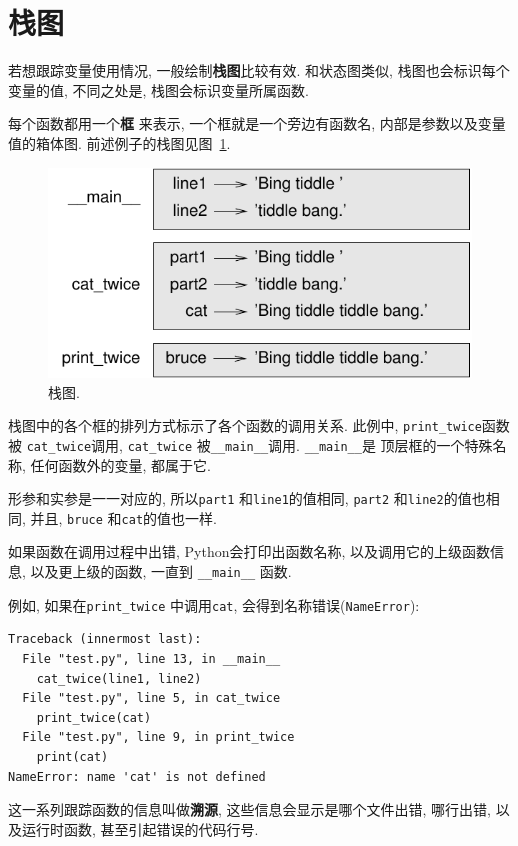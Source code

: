 \documentclass[10pt]{book}
\begin{document}
\section{栈图}
\label{stackdiagram}
若想跟踪变量使用情况, 一般绘制{\bf 栈图}比较有效. 
和状态图类似, 栈图也会标识每个变量的值, 不同之处是, 
栈图会标识变量所属函数. 

每个函数都用一个{\bf 框} 来表示, 一个框就是一个旁边有函数名, 
内部是参数以及变量值的箱体图. 
前述例子的栈图见图~\ref{fig.stack}. 

\begin{figure}
\centerline
{\includegraphics[scale=0.8]{figs/stack.pdf}}
\caption{栈图.}
\label{fig.stack}
\end{figure}

栈图中的各个框的排列方式标示了各个函数的调用关系. 
此例中, \verb"print_twice"函数被 \verb"cat_twice"调用, 
\verb"cat_twice" 被\verb"__main__"调用. \verb"__main__"是
顶层框的一个特殊名称, 任何函数外的变量, 都属于它. 

形参和实参是一一对应的, 所以{\tt part1} 和{\tt line1}的值相同, 
{\tt part2} 和{\tt line2}的值也相同, 并且, 
 {\tt bruce} 和{\tt cat}的值也一样. 

如果函数在调用过程中出错, Python会打印出函数名称, 
以及调用它的上级函数信息, 以及更上级的函数, 一直到 \verb"__main__" 函数.

例如, 如果在\verb"print_twice" 中调用{\tt cat}, 会得到名称错误({\tt NameError}):

\begin{verbatim}
Traceback (innermost last):
  File "test.py", line 13, in __main__
    cat_twice(line1, line2)
  File "test.py", line 5, in cat_twice
    print_twice(cat)
  File "test.py", line 9, in print_twice
    print(cat)
NameError: name 'cat' is not defined
\end{verbatim}
%
这一系列跟踪函数的信息叫做{\bf 溯源}, 这些信息会显示是哪个文件出错, 哪行出错, 
以及运行时函数, 甚至引起错误的代码行号. 
\end{document}
